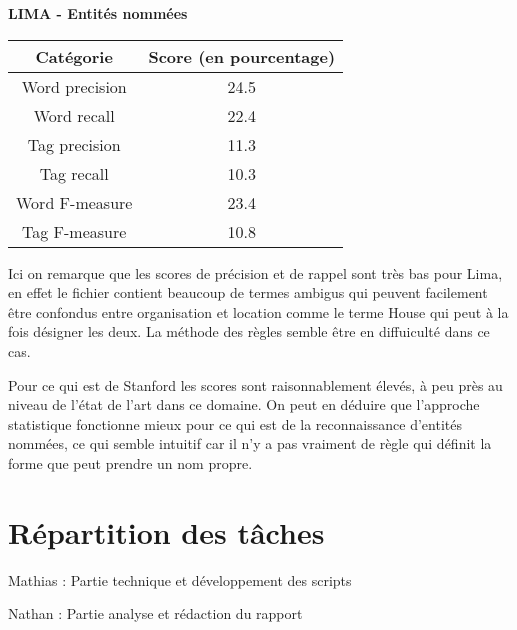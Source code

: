 \documentclass[12pt]{report}
\begin{document}
\vspace{15mm}
\newpage

\textbf{LIMA - Entités nommées}


\begin{tabular}{c c}
\hline
  Catégorie & Score (en pourcentage) \\
\hline
    Word precision & 24.5 \\
    Word recall & 22.4 \\
    Tag precision & 11.3 \\
    Tag recall & 10.3 \\
    Word F-measure & 23.4 \\
    Tag F-measure & 10.8 \\
    
\end{tabular}

Ici on remarque que les scores de précision et de rappel sont très bas pour Lima, en effet le fichier contient beaucoup de termes ambigus qui peuvent facilement être confondus entre organisation et location comme le terme House qui peut à la fois désigner les deux. La méthode des règles semble être en diffuiculté dans ce cas.

Pour ce qui est de Stanford les scores sont raisonnablement élevés, à peu près au niveau de l'état de l'art dans ce domaine. On peut en déduire que l'approche statistique fonctionne mieux pour ce qui est de la reconnaissance d'entités nommées, ce qui semble intuitif car il n'y a pas vraiment de règle qui définit la forme que peut prendre un nom propre.

\newpage
\section{Répartition des tâches}

Mathias : Partie technique et développement des scripts

Nathan :  Partie analyse et rédaction du rapport


\newpage

 
\end{document}
